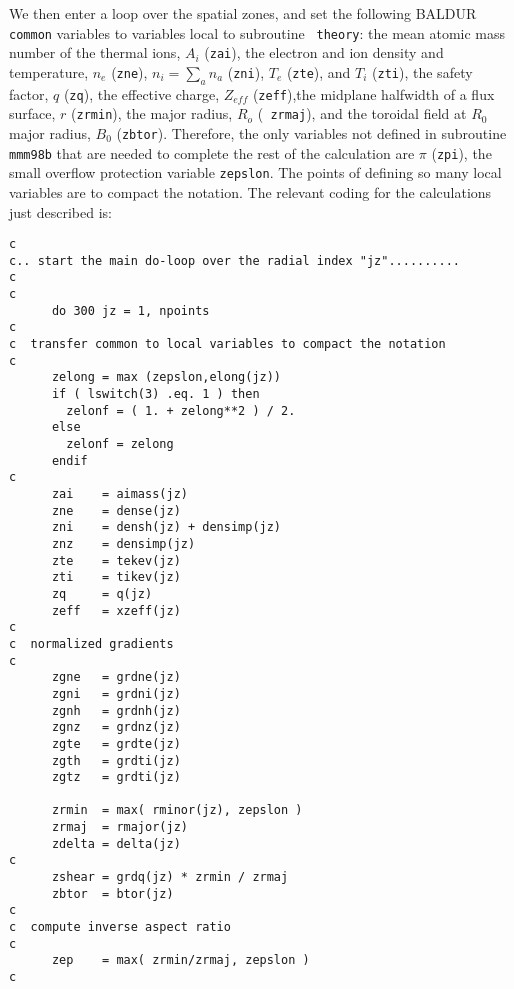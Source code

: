 We then enter a loop over the spatial zones, and set the following
BALDUR {\tt common} variables to variables local to subroutine {\tt
theory}: the mean atomic mass number of the thermal ions, $A_{i}$
({\tt zai}), the electron and ion density and temperature, $n_{e}$
({\tt zne}), $n_{i}=\sum_{a}n_{a}$ ({\tt zni}), $T_{e}$ ({\tt zte}),
and $T_{i}$ ({\tt zti}), the safety factor, $q$ ({\tt zq}), the
effective charge, $Z_{eff}$ ({\tt zeff}),the midplane halfwidth of a
flux surface, $r$ ({\tt zrmin}), the major radius, $R_{o}$ ({\tt
zrmaj}), and the toroidal field at $R_0$ major radius, $B_{0}$
({\tt zbtor}).  Therefore, the only variables not defined in
subroutine {\tt mmm98b} that are needed to complete the rest of the
calculation are $\pi$ ({\tt zpi}), the small overflow protection
variable {\tt zepslon}.  The points of defining so many local
variables are to compact the notation.  The relevant coding for the
calculations just described is:

\begin{verbatim}
c
c.. start the main do-loop over the radial index "jz"..........
c
c
      do 300 jz = 1, npoints
c
c  transfer common to local variables to compact the notation
c
      zelong = max (zepslon,elong(jz))
      if ( lswitch(3) .eq. 1 ) then
        zelonf = ( 1. + zelong**2 ) / 2.
      else
        zelonf = zelong
      endif
c
      zai    = aimass(jz)
      zne    = dense(jz)
      zni    = densh(jz) + densimp(jz)
      znz    = densimp(jz)
      zte    = tekev(jz)
      zti    = tikev(jz)
      zq     = q(jz)
      zeff   = xzeff(jz)
c
c  normalized gradients
c
      zgne   = grdne(jz)
      zgni   = grdni(jz)
      zgnh   = grdnh(jz)
      zgnz   = grdnz(jz)
      zgte   = grdte(jz)
      zgth   = grdti(jz)
      zgtz   = grdti(jz)

      zrmin  = max( rminor(jz), zepslon )
      zrmaj  = rmajor(jz)
      zdelta = delta(jz)
c
      zshear = grdq(jz) * zrmin / zrmaj
      zbtor  = btor(jz)
c
c  compute inverse aspect ratio
c
      zep    = max( zrmin/zrmaj, zepslon )
c
\end{verbatim}

